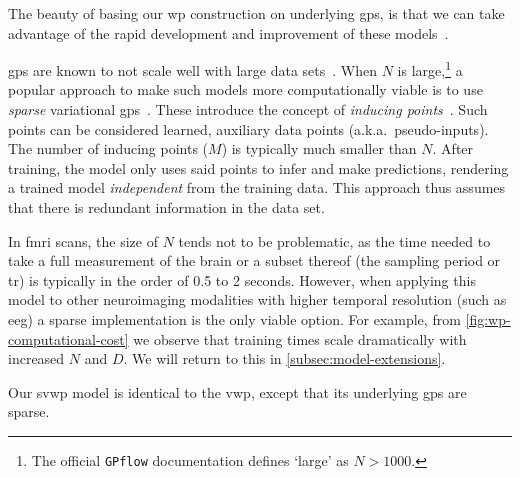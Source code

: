 The beauty of basing our \gls{wp} construction on underlying \glspl{gp}, is that we can take advantage of the rapid development and improvement of these models~\parencite[echoing sentiments from][]{Foti2019}.

\glspl{gp} are known to not scale well with large data sets~\parencite{Rasmussen2006}.
When $N$ is large,\footnote{The official \texttt{GPflow} documentation defines `large' as $N > 1000$.} a popular approach to make such models more computationally viable is to use \emph{sparse} variational \glspl{gp}~\parencite{Titsias2009, Hensman2013, Matthews2016}.
These introduce the concept of \emph{inducing points}~\parencite{Bauer2016}.
Such points can be considered learned, auxiliary data points (a.k.a.~pseudo-inputs).
The number of inducing points ($M$) is typically much smaller than $N$.
After training, the model only uses said points to infer and make predictions, rendering a trained model \emph{independent} from the training data.
This approach thus assumes that there is redundant information in the data set.

In \gls{fmri} scans, the size of $N$ tends not to be problematic, as the time needed to take a full measurement of the brain or a subset thereof (the sampling period or \gls{tr}) is typically in the order of 0.5 to 2 seconds.
However, when applying this model to other neuroimaging modalities with higher temporal resolution (such as \gls{eeg}) a sparse implementation is the only viable option.
For example, from \cref{fig:wp-computational-cost} we observe that training times scale dramatically with increased $N$ and $D$.
We will return to this in \cref{subsec:model-extensions}.

Our \gls{svwp} model is identical to the \gls{vwp}, except that its underlying \glspl{gp} are sparse.


